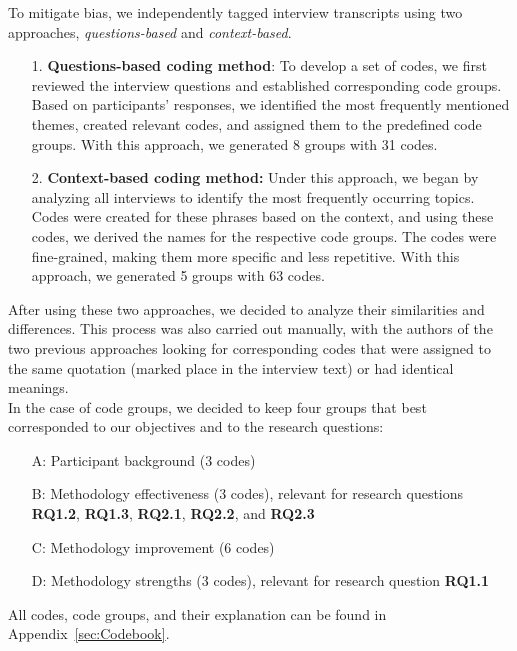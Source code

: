 To mitigate bias, we independently tagged interview transcripts using two approaches, \emph{questions-based} and \emph{context-based}.
\begin{itemize}
    \item[1.] \textbf{Questions-based coding method}:
    To develop a set of codes, we first reviewed the interview questions and established corresponding code groups. Based on participants' responses, we identified the most frequently mentioned themes, created relevant codes, and assigned them to the predefined code groups. With this approach, we generated 8 groups with 31 codes.

    \item[2.] \textbf{Context-based coding method:}
    Under this approach, we began by analyzing all interviews to identify the most frequently occurring topics. Codes were created for these phrases based on the context, and using these codes, we derived the names for the respective code groups. The codes were fine-grained, making them more specific and less repetitive. With this approach, we generated 5 groups with 63 codes.
\end{itemize}

After using these two approaches, we decided to analyze their similarities and differences. This process was also carried out manually, with the authors of the two previous approaches looking for corresponding codes that were assigned to the same quotation (marked place in the interview text) or had identical meanings.\\

In the case of code groups, we decided to keep four groups that best corresponded to our objectives and to the research questions:
\begin{itemize}
    \item[A:] Participant background (3 codes)
    \item[B:] Methodology effectiveness (3 codes), relevant for research questions \textbf{RQ1.2}, \textbf{RQ1.3}, \textbf{RQ2.1}, \textbf{RQ2.2}, and \textbf{RQ2.3}
    \item[C:] Methodology improvement (6 codes)
    \item[D:] Methodology strengths (3 codes), relevant for research question \textbf{RQ1.1}
\end{itemize}

All codes, code groups, and their explanation can be found in Appendix~\ref{sec:Codebook}. 